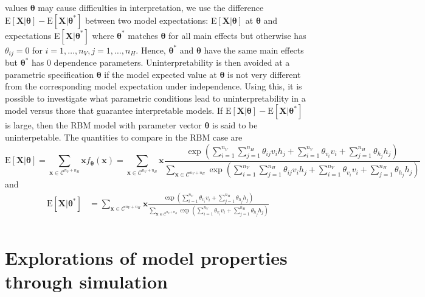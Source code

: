 \documentclass[]{article}
\theoremstyle{definition}
\newcommand{\nv}{{n_{\scriptscriptstyle V}}}
\newcommand{\nh}{{n_{\scriptscriptstyle H}}}
\begin{document}
values \(\boldsymbol \theta\) may cause difficulties in interpretation,
we use the difference
\(\text{E}\left[\boldsymbol X | \boldsymbol \theta\right] - \text{E}\left[\boldsymbol X | \boldsymbol \theta^* \right]\)
between two model expectations:
E\(\left[\boldsymbol X | \boldsymbol \theta\right]\) at
\(\boldsymbol \theta\) and expectations
E\(\left[\boldsymbol X | \boldsymbol \theta^* \right]\) where
\(\boldsymbol \theta^*\) matches \(\boldsymbol \theta\) for all main
effects but otherwise has \(\theta_{ij} = 0\) for
\(i = 1, \dots, \nv, j = 1, \dots, \nh\). Hence,
\(\boldsymbol \theta^*\) and \(\boldsymbol \theta\) have the same main
effects but \(\boldsymbol \theta^*\) has \(0\) dependence parameters.
Uninterpretability is then avoided at a parametric specification
\(\boldsymbol \theta\) if the model expected value at
\(\boldsymbol \theta\) is not very different from the corresponding
model expectation under independence. Using this, it is possible to
investigate what parametric conditions lead to uninterpretability in a
model versus those that guarantee interpretable models. If
\(\text{E}\left[\boldsymbol X | \boldsymbol \theta\right] - \text{E}\left[\boldsymbol X | \boldsymbol \theta^*\right]\)
is large, then the RBM model with parameter vector
\(\boldsymbol \theta\) is said to be uninterpetable. The quantities to
compare in the RBM case are \[
\text{E}\left[\boldsymbol X | \boldsymbol \theta\right] = \sum\limits_{\boldsymbol x \in \mathcal{C}^{\nv + \nh}} \boldsymbol x f_{\boldsymbol \theta}(\boldsymbol x) = \sum\limits_{\boldsymbol x \in \mathcal{C}^{\nv + \nh}} \boldsymbol x \frac{\exp\left(\sum\limits_{i = 1}^\nv \sum\limits_{j=1}^\nh \theta_{ij} v_i h_j + \sum\limits_{i = 1}^\nv\theta_{v_i} v_i + \sum\limits_{j = 1}^\nh\theta_{h_j} h_j\right)}{\sum\limits_{\boldsymbol x \in \mathcal{C}^{\nv + \nh}}\exp\left(\sum\limits_{i = 1}^\nv \sum\limits_{j=1}^\nh \theta_{ij} v_i h_j + \sum\limits_{i = 1}^\nv\theta_{v_i} v_i + \sum\limits_{j = 1}^\nh\theta_{h_j} h_j\right)}
\] and \begin{align*}
\text{E}\left[\boldsymbol X | \boldsymbol 
\theta^*\right] &= \sum\limits_{\boldsymbol x \in \mathcal{C}^{\nv + \nh}} \boldsymbol x \frac{\exp\left(\sum\limits_{i = 1}^\nv \theta_{v_i} v_i + \sum\limits_{j = 1}^\nh\theta_{h_j} h_j\right)}{\sum\limits_{\boldsymbol x \in \mathcal{C}^{\nv + \nh}}\exp\left(\sum\limits_{i = 1}^\nv\theta_{v_i} v_i + \sum\limits_{j = 1}^\nh\theta_{h_j} h_j\right)} \\
\end{align*}
\hypertarget{explorations-of-model-properties-through-simulation}{%
\section{Explorations of model properties through
simulation}\label{explorations-of-model-properties-through-simulation}}
\end{document}

